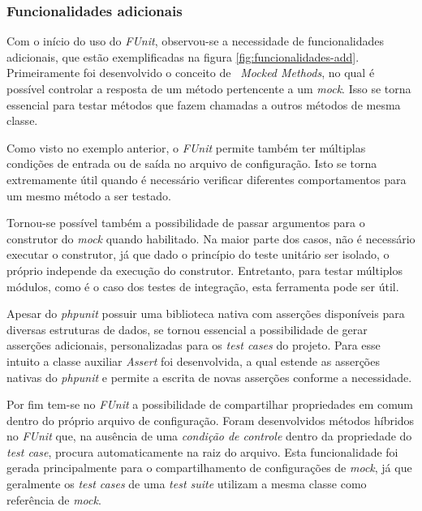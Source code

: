 \hypertarget{funcionalidades-adicionais}{%
\subsubsection{Funcionalidades adicionais}\label{funcionalidades-adicionais}}

Com o início do uso do \emph{FUnit}, observou-se a necessidade de funcionalidades adicionais, que estão exemplificadas na figura \ref{fig:funcionalidades-add}. Primeiramente foi desenvolvido o conceito de \emph{~Mocked Methods}, no qual é possível controlar a resposta de um método pertencente a um \emph{mock}. Isso se torna essencial para testar métodos que fazem chamadas a outros métodos de mesma classe.

Como visto no exemplo anterior, o \emph{FUnit} permite também ter múltiplas condições de entrada ou de saída no arquivo de configuração. Isto se torna extremamente útil quando é necessário verificar diferentes comportamentos para um mesmo método a ser testado.

Tornou-se possível também a possibilidade de passar argumentos para o construtor do \emph{mock} quando habilitado. Na maior parte dos casos, não é necessário executar o construtor, já que dado o princípio do teste unitário ser isolado, o próprio independe da execução do construtor. Entretanto, para testar múltiplos módulos, como é o caso dos testes de integração, esta ferramenta pode ser útil.

Apesar do \emph{phpunit} possuir uma biblioteca nativa com asserções disponíveis para diversas estruturas de dados, se tornou essencial a possibilidade de gerar asserções adicionais, personalizadas para os \emph{test cases} do projeto. Para esse intuito a classe auxiliar \emph{Assert} foi desenvolvida, a qual estende as asserções nativas do \emph{phpunit} e permite a escrita de novas asserções conforme a necessidade.

Por fim tem-se no \emph{FUnit} a possibilidade de compartilhar propriedades em comum dentro do próprio arquivo de configuração. Foram desenvolvidos métodos híbridos no \emph{FUnit} que, na ausência de uma \emph{condição de controle} dentro da propriedade do \emph{test case}, procura automaticamente na raiz do arquivo. Esta funcionalidade foi gerada principalmente para o compartilhamento de configurações de \emph{mock}, já que geralmente os \emph{test cases} de uma \emph{test suite} utilizam a mesma classe como referência de \emph{mock}.

